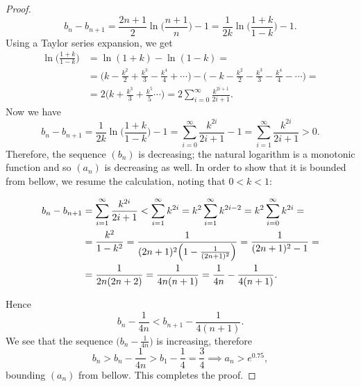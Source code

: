 \documentclass[10pt,a4paper]{amsart}
\begin{document}
\begin{proof}
    \[
        b_n - b_{n+1} = \frac{2n+1}{2} \ln\biggl( \frac{n+1}{n} \biggr) - 1 = \frac{1}{2k}\ln\biggl( \frac{1+k}{1-k} \biggr) - 1.
    \]
    Using a Taylor series expansion, we get        
    \begin{equation*}
    \begin{split}
        \ln\biggl( \frac{1+k}{1-k} \biggr) &= \ln(1+k) - \ln(1-k) = \\
        &= \biggl(k - \frac{k^2}{2} + \frac{k^3}{3} - \frac{k^4}{4} + \cdots \biggr) - \biggl(-k - \frac{k^2}{2} - \frac{k^3}{3} - \frac{k^4}{4} - \cdots \biggr) = \\
        &= 2\biggl( k + \frac{k^3}{3} + \frac{k^5}{5} \cdots \biggr) = 
        2\sum_{i=0}^\infty \frac{k^{2i+1}}{2i+1}.
    \end{split}
    \end{equation*}
    Now we have 
    \[
        b_n - b_{n+1} = \frac{1}{2k}\ln\biggl(\frac{1+k}{1-k}\biggr) - 1 = \sum_{i=0}^\infty \frac{k^{2i}}{2i+1} - 1 = \sum_{i=1}^\infty \frac{k^{2i}}{2i+1} > 0.
    \]
    Therefore, the sequence $(b_n)$ is decreasing; the natural logarithm is a monotonic function and so $(a_n)$ is decreasing as well. In order to show that it is bounded from bellow, we resume the calculation, noting that $0 < k < 1$:
    \begin{allowdisplaybreaks}
    \begin{equation*}
    \begin{split}
        b_n - b_{n+1} &= \sum_{i=1}^\infty \frac{k^{2i}}{2i+1} < \sum_{i=1}^\infty k^{2i} = k^2\sum_{i=1}^\infty k^{2i-2} = k^2\sum_{i=0}^\infty k^{2i} = \\
        &= \frac{k^2}{1-k^2} = \frac{1}{(2n+1)^2\Bigl( 1 - \frac{1}{(2n+1)^2} \Bigr)} = 
        \frac{1}{(2n+1)^2 - 1} = \\
        &= \frac{1}{2n(2n+2)} = \frac{1}{4n(n+1)} = \frac{1}{4n} - \frac{1}{4(n+1)}.
    \end{split}
    \end{equation*}
    \end{allowdisplaybreaks}
    Hence 
    \[
        b_n - \frac{1}{4n} < b_{n+1} - \frac{1}{4(n+1)}.
    \]
    We see that the sequence $\bigl(b_n - \frac{1}{4n}\bigr)$ is increasing, therefore 
    \[
        b_n > b_n - \frac{1}{4n} > b_1 - \frac{1}{4} = \frac{3}{4} \implies a_n > e^{0.75},
    \]
    bounding $(a_n)$ from bellow. This completes the proof.
\end{proof}
\end{document}
